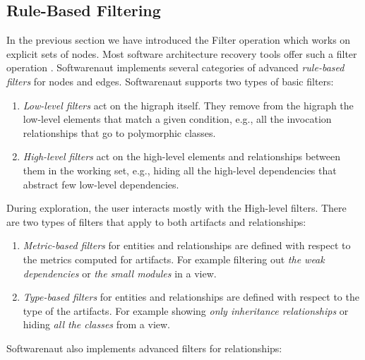 \documentclass[preprint,12pt]{elsarticle}
\begin{document}
\newpage
\subsection {Rule-Based Filtering}

In the previous section we have introduced the Filter operation which works on explicit sets of nodes. Most software architecture recovery tools offer such a filter operation \cite{aracic-filtering}. Softwarenaut implements several categories of advanced {\em rule-based filters} for nodes and edges. Softwarenaut supports two types of basic filters: 

\begin{enumerate}

\item {\em Low-level filters} act on the higraph itself. They remove from the higraph the low-level elements that match a given condition, e.g., all the invocation relationships that go to polymorphic classes.

\item {\em High-level filters} act on the high-level elements and relationships between them in the working set, e.g., hiding all the high-level dependencies that abstract few low-level dependencies.

\end{enumerate}

During exploration, the user interacts mostly with the High-level filters. There are two types of filters that apply to both artifacts and relationships: 

\begin{enumerate}
\item {\em Metric-based filters} for entities and relationships are defined with respect to the metrics computed for artifacts. For example filtering out {\em the weak dependencies} or {\em the small modules} in a view.
\item {\em Type-based filters} for entities and relationships are defined with respect to the type of the artifacts. For example showing {\em only inheritance relationships} or hiding {\em all the classes} from a view.
\end{enumerate}

Softwarenaut also implements advanced filters for relationships:
\end{document}

